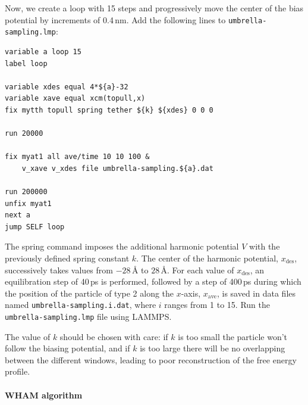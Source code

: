 \documentclass[9pt,tutorial]{livecoms}
\newcommand{\lmpcmd}[1]{\colorbox{listing}{\textcolor{command}{\small{#1}}}} %
\newcommand{\flecmd}[1]{\textcolor{command}{\texttt{#1}}} %
\begin{document}
Now, we create a loop with 15 steps and progressively move the center of the
bias potential by increments of 0.4\,nm.  Add the following lines to \flecmd{umbrella-sampling.lmp}:
\begin{lstlisting}
variable a loop 15
label loop

variable xdes equal 4*${a}-32
variable xave equal xcm(topull,x)
fix mytth topull spring tether ${k} ${xdes} 0 0 0

run 20000

fix myat1 all ave/time 10 10 100 &
    v_xave v_xdes file umbrella-sampling.${a}.dat

run 200000
unfix myat1
next a
jump SELF loop
\end{lstlisting}
The \lmpcmd{spring} command imposes the additional harmonic potential $V$ with
the previously defined spring constant $k$.  The center of the harmonic
potential, $x_\text{des}$, successively takes values
from $-28\,\text{\AA{}}$ to $28\,\text{\AA{}}$.  For each value of $x_\text{des}$,
an equilibration step of 40\,ps is performed, followed by a step
of 400\,ps during which the position of the particle of
type 2 along the $x$-axis, $x_\text{ave}$, is saved in data files named \flecmd{umbrella-sampling.i.dat},
where $i$ ranges from 1 to 15.  Run the \flecmd{umbrella-sampling.lmp} file using LAMMPS.

\begin{note}
The value of $k$ should be chosen with care:
if $k$ is too small the particle won't follow the biasing potential,
and if $k$ is too large there will be no overlapping between
the different windows, leading to poor reconstruction of the free energy profile.
\end{note}

\paragraph{WHAM algorithm}
\end{document}
